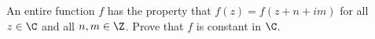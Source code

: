 An entire function $f$ has the property that $f(z)=f(z+n+im)$ for all
$z\in \C$ and all $n,m\in \Z$. Prove that $f$ is constant in $\C$.
